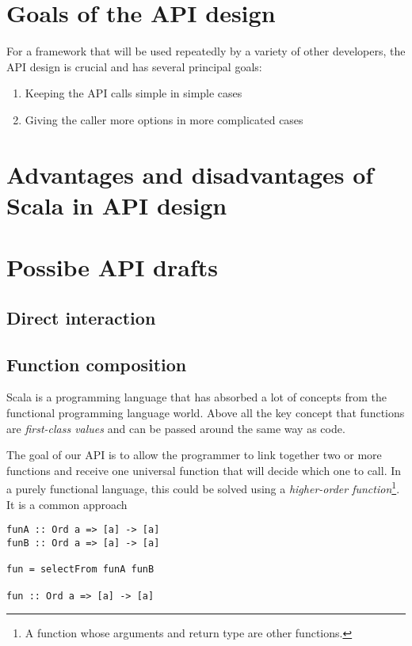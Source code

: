 \section{Goals of the API design}

For a framework that will be used repeatedly by a variety of other developers, the API design is crucial and has several principal goals:

\begin{enumerate}
	\item Keeping the API calls simple in simple cases
	\item Giving the caller more options in more complicated cases
\end{enumerate}

\section{Advantages and disadvantages of Scala in API design}


\section{Possibe API drafts}

\subsection{Direct interaction}

\subsection{Function composition}

Scala is a programming language that has absorbed a lot of concepts from the functional programming language world. Above all the key concept that functions are \textit{first-class values} and can be passed around the same way as code.

The goal of our API is to allow the programmer to link together two or more functions and receive one universal function that will decide which one to call. In a purely functional language, this could be solved using a \textit{higher-order function}\footnote{A function whose arguments and return type are other functions.}. It is a common approach

\lstset{language=Haskell}
\begin{lstlisting}
funA :: Ord a => [a] -> [a]
funB :: Ord a => [a] -> [a]

fun = selectFrom funA funB

fun :: Ord a => [a] -> [a]
\end{lstlisting}

